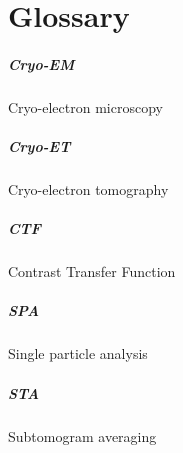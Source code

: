 \chapter{Glossary}

\paragraph{Cryo-EM} Cryo-electron microscopy
\paragraph{Cryo-ET} Cryo-electron tomography
\paragraph{CTF} Contrast Transfer Function
\paragraph{SPA} Single particle analysis
\paragraph{STA} Subtomogram averaging

